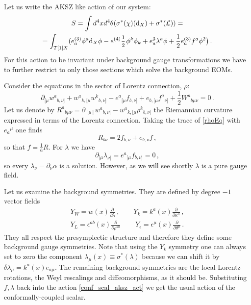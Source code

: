\documentclass[a4paper,12pt]{article}
\numberwithin{equation}{section} %
\newcommand{\dx}{\mathrm{d}_X}
\newcommand{\half}{\mathchoice{%
    \ffrac{1}{2}}{\frac{1}{2}}{\frac{1}{2}}{\frac{1}{2}}}
\newcommand{\ffrac}[2]{\raisebox{.5pt}%
  {\footnotesize$\displaystyle\frac{#1}{#2}$}\kern1pt}
\def\cL{\mathcal{L}}
\newcommand{\lorcon}{w}
\begin{document}
Let us write the AKSZ like action of our system:
\begin{multline} \label{conf_scal_aksz_act}
    S = \int d^4x d^4\theta (\sigma^*(\chi)(\dx) + \sigma^*(\cL)) = 
    \\
    = \int_{T[1]X}  ( e^{(3)}_a\phi^a \dx\phi - e^{(4)} \half \phi^k\phi_k + 
     e^{3}_a \lambda^{a} \phi + \frac{1}{2} e^{(3)}_a f^a \phi^2\big)\,.
\end{multline}
For this action to be invariant under background gauge transformations we have to further restrict to only those sections which solve the background EOMs. 

Consider the equations in the sector of Lorentz connection, $\rho$:
\begin{equation} \label{rhoEq}
    \partial_{[\mu}\lorcon^a{ }_{b,\nu]} + \lorcon^a{ }_{k,[\mu}\lorcon^k{ }_{b,\nu]} - e^a{ }_{[\mu}f_{b,\nu]} + e_{b,[\mu}f^a{ }_{\nu]} + \frac{1}{2}W^a{ }_{b\mu\nu} = 0\,.
\end{equation}
Let us denote by $R^a{ }_{b\mu\nu}=\partial_{[\mu]}\lorcon^a{ }_{b,\nu]} - \lorcon^a{ }_{k,[\mu}\rho^k{ }_{b,\nu]}$  the Riemannian curvature expressed in terms of the Lorentz connection. Taking the trace of \eqref{rhoEq} with $e_a{ }^{\mu}$ one finds 
\begin{equation}
    R_{b\nu} = 2f_{b,\nu} + e_{b,\nu}f\,,
\end{equation}
so that $f = \frac{1}{6}R$. For $\lambda$ we have
\begin{equation}
    \partial_{[\mu}\lambda_{\nu]} = e^a{ }_{[\mu}f_{b,\nu]} = 0\,,
\end{equation}
so every $\lambda_\nu = \partial_\nu \alpha$ is a solution. However, as we will see shortly $\lambda$ is a pure gauge field.

Let us examine the background symmetries. They are defined by degree $-1$ vector fields 
\begin{equation}
\begin{gathered}
    Y_{W} = w(x)\frac{\partial}{\partial \lambda} \,, \qquad Y_{k} = k^a(x)\frac{\partial}{\partial \kappa^a} \,, \\ Y_{L} = \epsilon^{ab}(x)\frac{\partial}{\partial \rho^{ab}}\, \qquad Y_\epsilon = \epsilon^\mu(x) \frac{\partial}{\partial \theta^\mu}\,.
\end{gathered}
\end{equation}
They all respect the presymplectic structure and therefore they define some background gauge symmetries. Note that using the $Y_k$ symmetry one can always set to zero the component $\lambda_\mu (x)\equiv \sigma^*(\lambda)$ because we can shift it by $\delta \lambda_{\mu} = k^a(x) e_{a\mu}$. The remaining background symmetries are the local Lorentz rotations, the Weyl rescalings and diffeomorphisms, as it should be. Substituting $f, \lambda$ back into the action \eqref{conf_scal_aksz_act} we get the usual action of the conformally-coupled scalar. 
\end{document}
